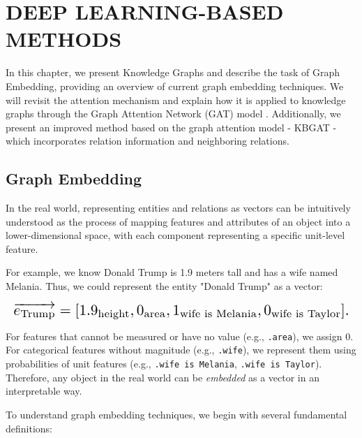 \section{DEEP LEARNING-BASED METHODS}
\label{chap:DeeLearning}

In this chapter, we present Knowledge Graphs and describe the task of Graph Embedding, providing an overview of current graph embedding techniques. We will revisit the attention mechanism and explain how it is applied to knowledge graphs through the Graph Attention Network (GAT) model \cite{velivckovic2017graph}. Additionally, we present an improved method based on the graph attention model - KBGAT \cite{nathani2019learning} - which incorporates relation information and neighboring relations.

\subsection{Graph Embedding}
\label{sec:graphEmbedding}

In the real world, representing entities and relations as vectors can be intuitively understood as the process of mapping features and attributes of an object into a lower-dimensional space, with each component representing a specific unit-level feature.

For example, we know Donald Trump is 1.9 meters tall and has a wife named Melania. Thus, we could represent the entity "Donald Trump" as a vector:

\[
\resizebox{\linewidth}{!}{$
\overrightarrow{e_\text{Trump}} = [1.9_{\text{height}}, 0_{\text{area}}, 1_{\text{wife is Melania}}, 0_{\text{wife is Taylor}}].
$}
\]

For features that cannot be measured or have no value (e.g., \texttt{.area}), we assign 0. For categorical features without magnitude (e.g., \texttt{.wife}), we represent them using probabilities of unit features (e.g., \texttt{.wife is Melania}, \texttt{.wife is Taylor}). Therefore, any object in the real world can be \textit{embedded} as a vector in an interpretable way.

To understand graph embedding techniques, we begin with several fundamental definitions:

